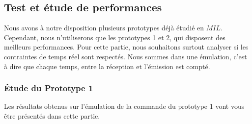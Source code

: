		\subsection{Test et étude de performances}
		Nous avons à notre disposition plusieurs prototypes déjà étudié en $MIL$. Cependant, nous n'utiliserons que les prototypes 1 et 2, qui disposent des meilleurs performances. Pour cette partie, nous souhaitons surtout analyser si les contraintes de temps réel sont respectés. Nous sommes dans une émulation, c'est à dire que chaque temps, entre la réception et l'émission est compté.
		
		\subsubsection{Étude du Prototype 1}		
		Les résultats obtenus sur l'émulation de la commande du prototype 1 vont vous être présentés dans cette partie.
